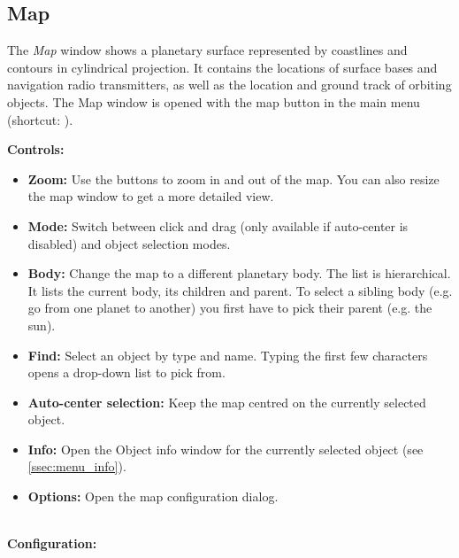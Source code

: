 \documentclass[Orbiter User Manual.tex]{subfiles}
\begin{document}
\subsection{Map}
\label{ssec:menu_map}
The \textit{Map} window shows a planetary surface represented by coastlines and contours in cylindrical projection. It contains the locations of surface bases and navigation radio transmitters, as well as the location and ground track of orbiting objects. The Map window is opened with the map button in the main menu (shortcut: \Ctrl{}).

\begin{figure}[H]
	\centering
\end{figure}

\noindent
\textbf{Controls:}

\begin{itemize}
\item \textbf{Zoom:} Use the buttons to zoom in and out of the map. You can also resize the map window to get a more detailed view.
\item \textbf{Mode:} Switch between click and drag (only available if auto-center is disabled) and object selection modes.
\item \textbf{Body:} Change the map to a different planetary body. The list is hierarchical. It lists the current body, its children and parent. To select a sibling body (e.g. go from one planet to another) you first have to pick their parent (e.g. the sun).
\item \textbf{Find:} Select an object by type and name. Typing the first few characters opens a drop-down list to pick from.
\item \textbf{Auto-center selection:} Keep the map centred on the currently selected object.
\item \textbf{Info:} Open the Object info window for the currently selected object (see \ref{ssec:menu_info}).
\item \textbf{Options:} Open the map configuration dialog.
\end{itemize}

\noindent
\\
\textbf{Configuration:}

\begin{figure}[H]
	\centering
\end{figure}
\end{document}
